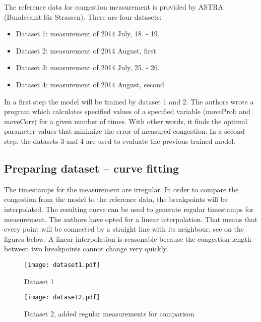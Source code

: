 The reference data for congestion measurement is provided by ASTRA (Bundesamt für Strassen). There are four datasets: 
\begin{itemize}
\item Dataset 1: measurement of 2014 July, 18. - 19.
\item Dataset 2: measurement of 2014 August, first
\item Dataset 3: measurement of 2014 July, 25. - 26.
\item Dataset 4: measurement of 2014 August, second
\end{itemize}

In a first step the model will be trained by dataset 1 and 2. The authors wrote a program which calculates specified values of a specified variable (moveProb and moveCorr) for a given number of times. With other words, it finds the optimal parameter values that minimize the error of measured congestion. In a second step, the datasets 3 and 4 are used to evaluate the previous trained model.

\subsection{Preparing dataset -- curve fitting}
The timestamps for the measurement are irregular. In order to compare the congestion from the model to the reference data, the breakpoints will be interpolated. The resulting curve can be used to generate regular timestamps for measurement. The authors have opted for a linear interpolation. That means that every point will be connected by a straight line with its neighbour, see on the figures below. A linear interpolation is reasonable because the congestion length between two breakpoints cannot change very quickly.


\begin{figure}[H]\centering
\texttt{[image: dataset1.pdf]}
\caption{Dataset 1}
\end{figure}
\vspace*{-1.5cm}
\begin{figure}[H]\centering
\texttt{[image: dataset2.pdf]}
\caption{Dataset 2, added regular measurements for comparison}
\end{figure}

